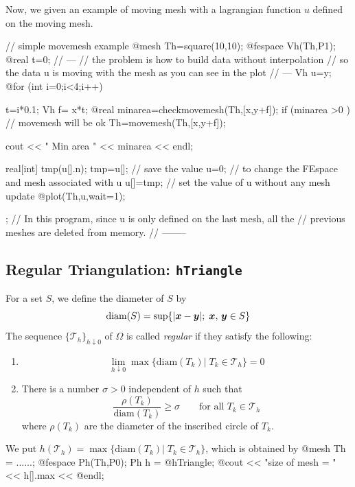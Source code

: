 \documentclass[a4paper,twoside,12pt]{book}
\def\vec#1{\mbox{\boldmath $#1$}}
\def\setS#1{#1\label{sec:#1}}
\begin{document}
\begin{example}
Now, we given an example of moving mesh with a lagrangian
function $u$ defined on the moving mesh.

\bFF
// simple movemesh example
@mesh Th=square(10,10);
@fespace Vh(Th,P1);
@real t=0;
// ---
//  the problem is how to build data without interpolation
//  so the data u is moving with the mesh as you can see in the plot
// ---
Vh u=y;
@for (int i=0;i<4;i++)
{
 t=i*0.1;
 Vh f= x*t;
 @real minarea=checkmovemesh(Th,[x,y+f]);
 if (minarea >0 ) // movemesh will be ok
   Th=movemesh(Th,[x,y+f]);

 cout << " Min area  " << minarea << endl;

 real[int] tmp(u[].n);
 tmp=u[];  // save the value
 u=0;        // to change the FEspace and mesh associated with u
 u[]=tmp;  // set the value of u without any mesh update
 @plot(Th,u,wait=1);
};
// In this program, since u is only defined on the last mesh, all the \hfilll
// previous meshes are deleted from memory.  \hfilll
//   --------  \hfilll
\eFF
\end{example}

\subsection{\setS{Regular Triangulation}: {\tt hTriangle}}
For a set $S$, we define the diameter of $S$ by
\[
\textrm{diam}(S)=\sup\{|\vec{x}-\vec{y}|; \; \vec{x},\, \vec{y}\in S\}
\]
The sequence $\{\mathcal{T}_h\}_{h\downarrow 0}$ of $\Omega$ is called
\emph{regular} if they satisfy the following:
\begin{enumerate}
  \item
\[
\lim_{h\downarrow 0}\max\{\textrm{diam}(T_k)|\; T_k\in \mathcal{T}_h\}=0
\]
  \item
There is a number $\sigma>0$ independent of $h$ such that
\[
\frac{\rho(T_k)}{\textrm{diam}(T_k)}\ge \sigma
\qquad \textrm{for all }T_k\in \mathcal{T}_h
\]
where $\rho(T_k)$ are the diameter of the inscribed circle of $T_k$.
\end{enumerate}
We put $h(\mathcal{T}_h)=\max\{\textrm{diam}(T_k)|\; T_k\in \mathcal{T}_h\}$,
which is obtained by
\bFF
@mesh Th = ......;
@fespace Ph(Th,P0);
Ph h = @hTriangle;
@cout << "size of mesh = " << h[].max << @endl;
\eFF
\end{document}

